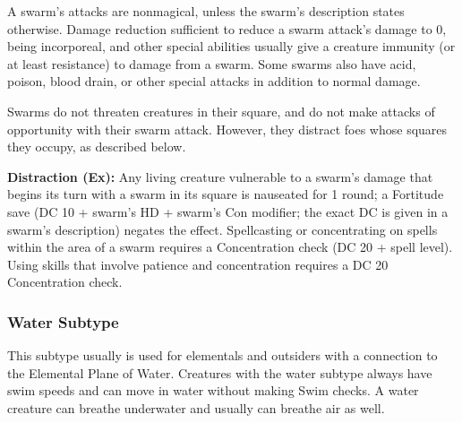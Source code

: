 
A swarm's attacks are nonmagical, unless the swarm's description states otherwise. Damage reduction sufficient to reduce a swarm attack's damage to 0, being incorporeal, and other special abilities usually give a creature immunity (or at least resistance) to damage from a swarm. Some swarms also have acid, poison, blood drain, or other special attacks in addition to normal damage.

Swarms do not threaten creatures in their square, and do not make attacks of opportunity with their swarm attack. However, they distract foes whose squares they occupy, as described below.

\textbf{Distraction (Ex):} Any living creature vulnerable to a swarm's damage that begins its turn with a swarm in its square is nauseated for 1 round; a Fortitude save (DC 10 + \onehalf swarm's HD + swarm's Con modifier; the exact DC is given in a swarm's description) negates the effect. Spellcasting or concentrating on spells within the area of a swarm requires a Concentration check (DC 20 + spell level). Using skills that involve patience and concentration requires a DC 20 Concentration check.

\subsubsection{Water Subtype}
This subtype usually is used for elementals and outsiders with a connection to the Elemental Plane of Water. Creatures with the water subtype always have swim speeds and can move in water without making Swim checks. A water creature can breathe underwater and usually can breathe air as well.

